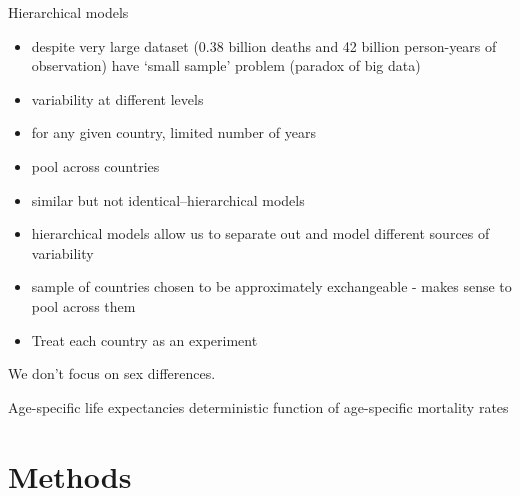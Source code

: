 \documentclass[11pt]{article}\usepackage[]{graphicx}\usepackage[]{color}
\begin{document}
 Hierarchical models
 \begin{itemize}
   \item despite very large dataset (0.38 billion deaths and  42 billion person-years of observation) have `small sample' problem (paradox of big data)
   \item variability at different levels
   \item for any given country, limited number of years
   \item pool across countries
   \item similar but not identical--hierarchical models
   \item hierarchical models allow us to separate out and model different sources of variability
   \item sample of countries chosen to be approximately exchangeable - makes sense to pool across them
   \item Treat each country as an experiment
 \end{itemize}
 
 We don't focus on sex differences.
 
 
 Age-specific life expectancies deterministic function of age-specific mortality rates
 
 


\section*{Methods}
  \label{sec:methods}





\end{document}
